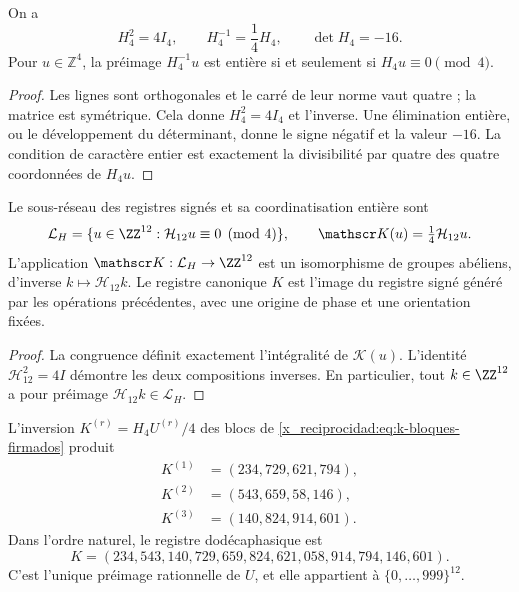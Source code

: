 \begin{lemma}
\label{x_reciprocidad:lem:k-hadamard}
On a
\[
 H_4^2=4I_4,\qquad H_4^{-1}=\frac14H_4,\qquad\det H_4=-16.
\]
Pour \(u\in\mathbb Z^4\), la préimage \(H_4^{-1}u\) est entière si et
seulement si \(H_4u\equiv0\pmod4\).
\end{lemma}

\begin{proof}
Les lignes sont orthogonales et le carré de leur norme vaut quatre ; la matrice est symétrique. Cela donne \(H_4^2=4I_4\) et l'inverse. Une élimination entière, ou le développement du déterminant, donne le signe négatif et la valeur \(-16\). La condition de caractère entier est exactement la divisibilité par quatre des quatre coordonnées de \(H_4u\).
\end{proof}

\begin{definition}
Le sous-réseau des registres signés et sa coordinatisation entière sont
\[
 \mathcal L_H=\{u\in\ZZ^{12}:\mathcal H_{12}u\equiv0\pmod4\},
 \qquad \mathscr K(u)=\tfrac14\mathcal H_{12}u.
\]
L'application \(\mathscr K:\mathcal L_H\to\ZZ^{12}\) est un isomorphisme
de groupes abéliens, d'inverse \(k\mapsto\mathcal H_{12}k\).
Le registre canonique \(K\) est l'image du registre signé généré
par les opérations précédentes, avec une origine de phase et une orientation fixées.
\end{definition}

\begin{proof}
La congruence définit exactement l'intégralité de \(\mathscr K(u)\).
L'identité \(\mathcal H_{12}^2=4I\) démontre les deux compositions
inverses. En particulier, tout \(k\in\ZZ^{12}\) a pour préimage
\(\mathcal H_{12}k\in\mathcal L_H\).
\end{proof}

\begin{proposition}
\label{x_reciprocidad:prop:k-sello}
L'inversion \(K^{(r)}=H_4U^{(r)}/4\) des blocs de
\eqref{x_reciprocidad:eq:k-bloques-firmados} produit
\begin{align*}
 K^{(1)}&=(234,729,621,794),\\
 K^{(2)}&=(543,659,58,146),\\
 K^{(3)}&=(140,824,914,601).
\end{align*}
Dans l'ordre naturel, le registre dodécaphasique est
\begin{equation}
 K=(234,543,140,729,659,824,621,058,914,794,146,601).
 \label{x_reciprocidad:eq:k-vector}
\end{equation}
C'est l'unique préimage rationnelle de \(U\), et elle appartient à \(\{0,\ldots,999\}^{12}\).
\end{proposition}


